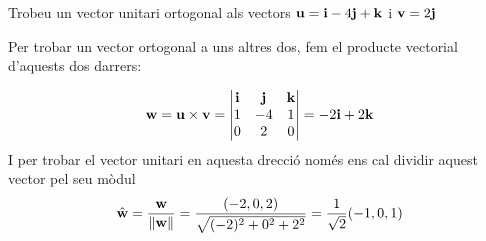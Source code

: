 \Exercise Trobeu un vector unitari ortogonal als vectors $\textbf{u}=\textbf{i}-4\textbf{j}+\textbf{k}$ i $\textbf{v}=2\textbf{j}$

\Answer Per trobar un vector ortogonal a uns altres dos, fem el producte vectorial d'aquests dos darrers:

\[
\textbf{w}=\textbf{u} \times \textbf{v} = \begin{vmatrix}
\textbf{i} & \textbf{j} & \textbf{k} \\
1 & -4 & 1\\
0 & 2 & 0
\end{vmatrix}=
-2\textbf{i}+2\textbf{k}
\]
I per trobar el vector unitari en aquesta drecció només ens cal dividir aquest vector pel seu mòdul
\[
\hat{\textbf{w}}=\frac{\textbf{w}}{\norm{\textbf{w}}}=\frac{(-2,0,2)}{\sqrt{(-2)^2+0^2+2^2}}=\frac{1}{\sqrt{2}}(-1,0,1)
\]
\blacksquare
